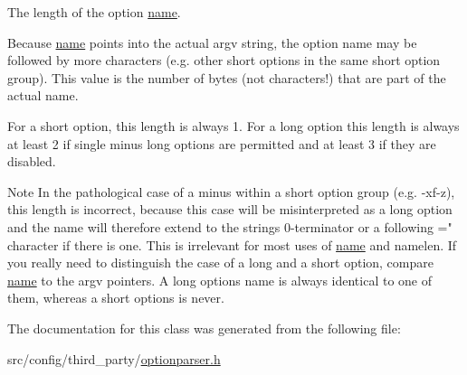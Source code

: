 The length of the option \hyperlink{classxmem_1_1config_1_1third__party_1_1_option_aa73b73027c0a9140aeec654f3fe9aef6}{name}. 

Because \hyperlink{classxmem_1_1config_1_1third__party_1_1_option_aa73b73027c0a9140aeec654f3fe9aef6}{name} points into the actual {\ttfamily argv} string, the option name may be followed by more characters (e.\+g. other short options in the same short option group). This value is the number of bytes (not characters!) that are part of the actual name.

For a short option, this length is always 1. For a long option this length is always at least 2 if single minus long options are permitted and at least 3 if they are disabled.

\begin{DoxyNote}{Note}
In the pathological case of a minus within a short option group (e.\+g. {\ttfamily -\/xf-\/z}), this length is incorrect, because this case will be misinterpreted as a long option and the name will therefore extend to the string\textquotesingle{}s 0-\/terminator or a following \textquotesingle{}=" character if there is one. This is irrelevant for most uses of \hyperlink{classxmem_1_1config_1_1third__party_1_1_option_aa73b73027c0a9140aeec654f3fe9aef6}{name} and {\ttfamily namelen}. If you really need to distinguish the case of a long and a short option, compare \hyperlink{classxmem_1_1config_1_1third__party_1_1_option_aa73b73027c0a9140aeec654f3fe9aef6}{name} to the {\ttfamily argv} pointers. A long option\textquotesingle{}s {\ttfamily name} is always identical to one of them, whereas a short option\textquotesingle{}s is never. 
\end{DoxyNote}


The documentation for this class was generated from the following file\+:\begin{DoxyCompactItemize}
\item 
src/config/third\+\_\+party/\hyperlink{optionparser_8h}{optionparser.\+h}\end{DoxyCompactItemize}
